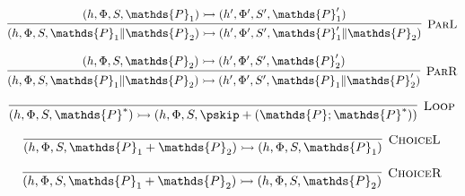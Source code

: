 \[
\infer[\textsc{ParL}]
{
	 (h, \Phi, S, \mathds{P}_1 \| \mathds{P}_2)
	\rightarrowtail
	(h', \Phi', S', \mathds{P}_1' \| \mathds{P}_2)
}
{
	 (h, \Phi, S, \mathds{P}_1)
	\rightarrowtail
	(h', \Phi', S', \mathds{P}_1')
}
\]

\[
\infer[\textsc{ParR}]
{
	 (h, \Phi, S, \mathds{P}_1 \| \mathds{P}_2)
	\rightarrowtail
	(h', \Phi', S', \mathds{P}_1 \| \mathds{P}_2')
}
{
	 (h, \Phi, S, \mathds{P}_2)
	\rightarrowtail
	(h', \Phi', S', \mathds{P}_2')
}
\]

\[
\infer[\textsc{Loop}]
{
	 (h, \Phi, S, \mathds{P}^*)
	\rightarrowtail
	(h, \Phi, S, \pskip + (\mathds{P} ; \mathds{P}^*))
}
{}
\]

\[
\infer[\textsc{ChoiceL}]
{
	 (h, \Phi, S, \mathds{P}_1 + \mathds{P}_2)
	\rightarrowtail
	(h, \Phi, S, \mathds{P}_1)
}
{}
\]

\[
\infer[\textsc{ChoiceR}]
{
	 (h, \Phi, S, \mathds{P}_1 + \mathds{P}_2)
	\rightarrowtail
	(h, \Phi, S, \mathds{P}_2)
}
{}
\]
